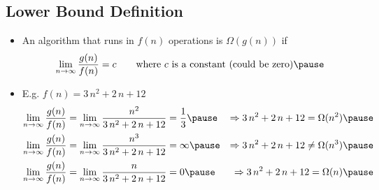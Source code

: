 \begin{slide}
\section{Lower Bound Definition}

\begin{PauseHighLight}
  \begin{itemize}
  \item An algorithm that runs in $f(n)$ operations is $\Omega(g(n))$ if
    \begin{displaymath}
      \lim_{n\rightarrow\infty} \frac{g(n)}{f(n)} = c \qquad
      \mbox{where $c$ is a constant (could be zero)}\pause
    \end{displaymath}
  \item E.g. $f(n)=3\,n^2 + 2\,n + 12$
    \begin{align*}
      \lim_{n\rightarrow\infty} \frac{g(n)}{f(n)} &=
      \lim_{n\rightarrow\infty} \frac{n^2}{3\,n^2 + 2\,n + 12}
      = \frac{1}{3}\pause &
      \Rightarrow 3\,n^2 + 2\,n + 12 = \Omega(n^2)\pause
      \\
      \lim_{n\rightarrow\infty} \frac{g(n)}{f(n)} &=
      \lim_{n\rightarrow\infty} \frac{n^3}{3\,n^2 + 2\,n + 12} =
      \infty\pause &
      \Rightarrow 3\,n^2 + 2\,n + 12 \neq \Omega(n^3)\pause
      \\
      \lim_{n\rightarrow\infty} \frac{g(n)}{f(n)} &=
      \lim_{n\rightarrow\infty} \frac{n}{3\,n^2 + 2\,n + 12} = 0\pause &
      \Rightarrow 3\,n^2 + 2\,n + 12 = \Omega(n)\pause
    \end{align*}
  \end{itemize}
\end{PauseHighLight}

\end{slide}


